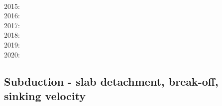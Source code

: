 {      \cite{gagd14}\cite{voge14}\cite{voge14b}\cite{lidr14}\cite{bocj04}\cite{bagb14}\cite{stjm14}
      \cite{basc14}\cite{vamd14}\cite{kile14}\cite{jahm14}\cite{bufa14}\cite{bufy14b}\cite{chsv14}
      \cite{chsg14}\cite{sigb14}\cite{shjm14}\cite{mova14}\cite{olpr14}\cite{paml14b}\cite{mafv14}\\
2015: \cite{bemm15}\cite{bomv15}\cite{bogf15}\cite{ceag15}\cite{kifr15}\cite{vami15}\cite{dali15}
      \cite{mami15}\cite{rula15}\cite{chsd15}\cite{dusc15}\cite{yotr15}\cite{cibi15}\cite{hobb15}
      \cite{carr15}\\
2016: \cite{tomy16}\cite{gukt16}\cite{robn16}\cite{mavm16}\cite{magc16}\cite{marl16}\cite{mesj16}
      \cite{jada16}\cite{jada16b}\cite{liku16}\cite{chss16}\\
2017: \cite{kicf17}\cite{sche17}\cite{pest17}\cite{vomc17}\cite{majf17}\cite{yabr17}\cite{shwl17}
      \cite{hobe17}\\
2018: \cite{yamz18}\cite{crli18}\cite{spcv18}\cite{chss18}\cite{yagz18}\cite{mazh18}\cite{pukp18}
      \cite{masg18}\cite{biar18}\\
2019: \cite{magn19}\cite{mavb19}\cite{scvm19}\cite{cakc19}\cite{samo19}\cite{sihf19}\cite{meag19}
      \cite{vaws19}\cite{bokg19}\cite{vawg19}\cite{cibi19}\\
2020: \cite{algg20}\cite{braf20}\cite{vamg20}
}

\subsection{Subduction - slab detachment, break-off, sinking velocity}


